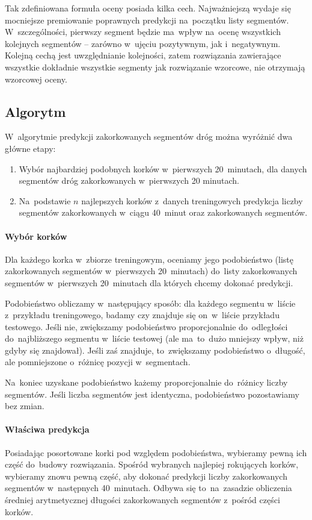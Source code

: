 \documentclass[a4paper,12pt]{mwart}
\begin{document}
Tak zdefiniowana formuła oceny posiada kilka cech. Najważniejszą wydaje się mocniejsze premiowanie poprawnych predykcji na~początku listy segmentów. W~szczególności, pierwszy segment będzie ma~wpływ na~ocenę wszystkich kolejnych segmentów -- zarówno w~ujęciu pozytywnym, jak i~negatywnym. Kolejną cechą jest uwzględnianie kolejności, zatem rozwiązania zawierające wszystkie dokładnie wszystkie segmenty jak rozwiązanie wzorcowe, nie otrzymają wzorcowej oceny.

\subsection{Algorytm}

W~algorytmie predykcji zakorkowanych segmentów dróg można wyróżnić dwa główne etapy:

\begin{enumerate}
\item Wybór najbardziej podobnych korków w~pierwszych 20~minutach, dla danych segmentów dróg zakorkowanych w~pierwszych 20 minutach.
\item Na~podstawie $n$ najlepszych korków z~danych treningowych predykcja liczby segmentów zakorkowanych w~ciągu 40~minut oraz zakorkowanych segmentów.
\end{enumerate}

\paragraph{Wybór korków} Dla każdego korka w~zbiorze treningowym, oceniamy jego podobieństwo (listę zakorkowanych segmentów w~pierwszych 20~minutach) do~listy zakorkowanych segmentów w~pierwszych 20~minutach dla których chcemy dokonać predykcji.

Podobieństwo obliczamy w~następujący sposób: dla każdego segmentu w~liście z~przykładu treningowego, badamy czy znajduje się on~w~liście przykładu testowego. Jeśli nie, zwiększamy podobieństwo proporcjonalnie do~odległości do~najbliższego segmentu w~liście testowej (ale ma~to~dużo mniejszy wpływ, niż gdyby się znajdował). Jeśli zaś znajduje, to~zwiększamy podobieństwo o~długość, ale pomniejszone o~różnicę pozycji w~segmentach.

Na~koniec uzyskane podobieństwo każemy proporcjonalnie do~różnicy liczby segmentów. Jeśli liczba segmentów jest identyczna, podobieństwo pozostawiamy bez zmian.

\paragraph{Właściwa predykcja} Posiadając posortowane korki pod względem podobieństwa, wybieramy pewną ich część do~budowy rozwiązania. Spośród wybranych najlepiej rokujących korków, wybieramy znowu pewną część, aby dokonać predykcji liczby zakorkowanych segmentów w~następnych 40~minutach. Odbywa się to~na~zasadzie obliczenia średniej arytmetycznej długości zakorkowanych segmentów z~pośród części korków.
\end{document}
